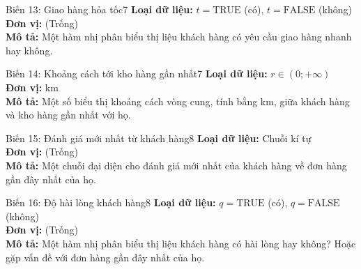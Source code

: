 \noindent
\begin{minipage}[t]{0.48\textwidth}
\begin{mainbox}{Biến 13: Giao hàng hỏa tốc}{7}
    \textbf{Loại dữ liệu:} \(t = \text{TRUE}\) (có), \(t = \text{FALSE}\) (không) \\
    \textbf{Đơn vị:} (Trống) \\
    \textbf{Mô tả:} Một hàm nhị phân biểu thị liệu khách hàng có yêu cầu giao hàng nhanh hay không.
\end{mainbox}
\end{minipage}
\hfill
\begin{minipage}[t]{0.48\textwidth}
\begin{mainbox}{Biến 14: Khoảng cách tới kho hàng gần nhất}{7}
    \textbf{Loại dữ liệu:} \(r \in (0; +\infty)\) \\
    \textbf{Đơn vị:} km \\
    \textbf{Mô tả:} Một số biểu thị khoảng cách vòng cung, tính bằng km, giữa khách hàng và kho hàng gần nhất với họ.
\end{mainbox}
\end{minipage}

\vspace{0.5cm}

\noindent
\begin{minipage}[t]{0.48\textwidth}
\begin{mainbox}{Biến 15: Đánh giá mới nhất từ khách hàng}{8}
    \textbf{Loại dữ liệu:} Chuỗi kí tự \\
    \textbf{Đơn vị:} (Trống) \\
    \textbf{Mô tả:} Một chuỗi đại diện cho đánh giá mới nhất của khách hàng về đơn hàng gần đây nhất của họ.
\end{mainbox}
\end{minipage}
\hfill
\begin{minipage}[t]{0.48\textwidth}
\begin{mainbox}{Biến 16: Độ hài lòng khách hàng}{8}
    \textbf{Loại dữ liệu:} \(q = \text{TRUE}\) (có), \(q = \text{FALSE}\) (không) \\
    \textbf{Đơn vị:} (Trống) \\
    \textbf{Mô tả:} Một hàm nhị phân biểu thị liệu khách hàng có hài lòng hay không? Hoặc gặp vấn đề với đơn hàng gần đây nhất của họ.
\end{mainbox}
\end{minipage}